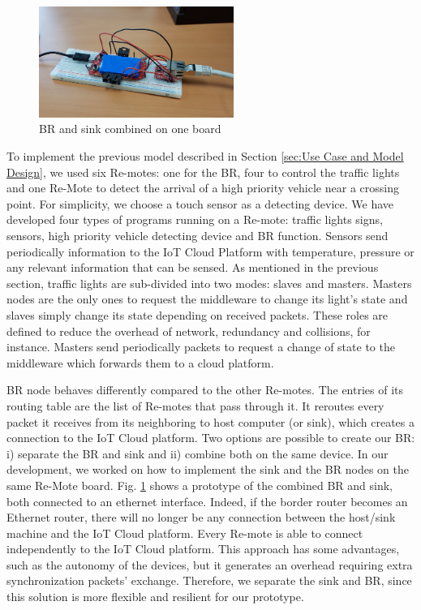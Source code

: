 \documentclass[conference]{../../setup/IEEEtran}
\begin{document}
\begin{figure}[!htb]
\centering
\includegraphics[width=2.5in]{Figures/ethernetRouter.png}
\caption{BR and sink combined on one board}
\label{fig:ethernetRouter.png}
\end{figure}
To implement the previous model described in Section \ref{sec:Use Case and Model Design}, we used six Re-motes: one for the BR, four to control the traffic lights and one Re-Mote to detect the arrival of a high priority vehicle near a crossing point. For simplicity, we choose a touch sensor as a detecting device. We have developed four types of programs running on a Re-mote: traffic lights signs, sensors, high priority vehicle detecting device and BR function. Sensors send periodically information to the IoT Cloud Platform with temperature, pressure or any relevant information that can be sensed. As mentioned in the previous section, traffic lights are sub-divided into two modes: slaves and masters. Masters nodes are the only ones to request the middleware to change its light’s state and slaves simply change its state depending on received packets. These roles are defined to reduce the overhead of network, redundancy and collisions, for instance. Masters send periodically packets to request a change of state to the middleware which forwards them to a cloud platform.




 
BR node behaves differently compared to the other Re-motes. The entries of its routing table are the list of Re-motes that pass through it. It reroutes every packet it receives from its neighboring to host computer (or sink), which  creates a connection to the IoT Cloud platform. Two options are possible to create our BR: i) separate the BR and sink and ii) combine both on the same device. 
In our development, we worked on how to implement the sink and the BR nodes on the same Re-Mote board. Fig. \ref{fig:ethernetRouter.png} shows a prototype of the combined BR and sink, both connected to an ethernet interface. Indeed, if the border router becomes an Ethernet router, there will no longer be any connection between the host/sink machine and the IoT Cloud platform. Every Re-mote is able to connect independently to the IoT Cloud platform. This approach has some advantages, such as the autonomy of the devices, but it generates an overhead requiring extra synchronization packets' exchange. Therefore, we separate the sink and BR, since this solution is more flexible and resilient for our prototype.
\end{document}
